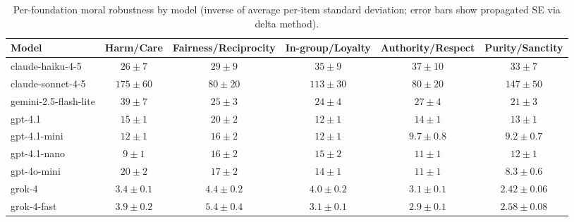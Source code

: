 \begin{table*}[t]
  \centering
  \caption{Per-foundation moral robustness by model (inverse of average per-item standard deviation; error bars show propagated SE via delta method).}
  \label{tab:robustness_by_foundation}
  \begin{tabular}{lccccc}
    \toprule
    Model & Harm/Care & Fairness/Reciprocity & In-group/Loyalty & Authority/Respect & Purity/Sanctity \\
    \midrule
    claude-haiku-4-5 & $26\pm 7$ & $29\pm 9$ & $35\pm 9$ & $37\pm 10$ & $33\pm 7$ \\
    claude-sonnet-4-5 & $175\pm 60$ & $80\pm 20$ & $113\pm 30$ & $80\pm 20$ & $147\pm 50$ \\
    gemini-2.5-flash-lite & $39\pm 7$ & $25\pm 3$ & $24\pm 4$ & $27\pm 4$ & $21\pm 3$ \\
    gpt-4.1 & $15\pm 1$ & $20\pm 2$ & $12\pm 1$ & $14\pm 1$ & $13\pm 1$ \\
    gpt-4.1-mini & $12\pm 1$ & $16\pm 2$ & $12\pm 1$ & $9.7\pm 0.8$ & $9.2\pm 0.7$ \\
    gpt-4.1-nano & $9\pm 1$ & $16\pm 2$ & $15\pm 2$ & $11\pm 1$ & $12\pm 1$ \\
    gpt-4o-mini & $20\pm 2$ & $17\pm 2$ & $14\pm 1$ & $11\pm 1$ & $8.3\pm 0.6$ \\
    grok-4 & $3.4\pm 0.1$ & $4.4\pm 0.2$ & $4.0\pm 0.2$ & $3.1\pm 0.1$ & $2.42\pm 0.06$ \\
    grok-4-fast & $3.9\pm 0.2$ & $5.4\pm 0.4$ & $3.1\pm 0.1$ & $2.9\pm 0.1$ & $2.58\pm 0.08$ \\
    \bottomrule
  \end{tabular}
\end{table*}
